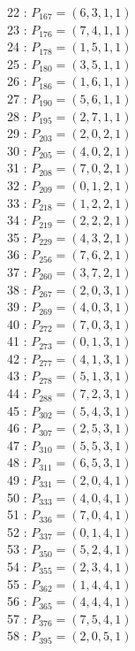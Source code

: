 \documentclass{article}
\begin{document}
{\begin{multicols}{3}
22 : $P_{167}=( 6, 3, 1, 1 )$\\
23 : $P_{176}=( 7, 4, 1, 1 )$\\
24 : $P_{178}=( 1, 5, 1, 1 )$\\
25 : $P_{180}=( 3, 5, 1, 1 )$\\
26 : $P_{186}=( 1, 6, 1, 1 )$\\
27 : $P_{190}=( 5, 6, 1, 1 )$\\
28 : $P_{195}=( 2, 7, 1, 1 )$\\
29 : $P_{203}=( 2, 0, 2, 1 )$\\
30 : $P_{205}=( 4, 0, 2, 1 )$\\
31 : $P_{208}=( 7, 0, 2, 1 )$\\
32 : $P_{209}=( 0, 1, 2, 1 )$\\
33 : $P_{218}=( 1, 2, 2, 1 )$\\
34 : $P_{219}=( 2, 2, 2, 1 )$\\
35 : $P_{229}=( 4, 3, 2, 1 )$\\
36 : $P_{256}=( 7, 6, 2, 1 )$\\
37 : $P_{260}=( 3, 7, 2, 1 )$\\
38 : $P_{267}=( 2, 0, 3, 1 )$\\
39 : $P_{269}=( 4, 0, 3, 1 )$\\
40 : $P_{272}=( 7, 0, 3, 1 )$\\
41 : $P_{273}=( 0, 1, 3, 1 )$\\
42 : $P_{277}=( 4, 1, 3, 1 )$\\
43 : $P_{278}=( 5, 1, 3, 1 )$\\
44 : $P_{288}=( 7, 2, 3, 1 )$\\
45 : $P_{302}=( 5, 4, 3, 1 )$\\
46 : $P_{307}=( 2, 5, 3, 1 )$\\
47 : $P_{310}=( 5, 5, 3, 1 )$\\
48 : $P_{311}=( 6, 5, 3, 1 )$\\
49 : $P_{331}=( 2, 0, 4, 1 )$\\
50 : $P_{333}=( 4, 0, 4, 1 )$\\
51 : $P_{336}=( 7, 0, 4, 1 )$\\
52 : $P_{337}=( 0, 1, 4, 1 )$\\
53 : $P_{350}=( 5, 2, 4, 1 )$\\
54 : $P_{355}=( 2, 3, 4, 1 )$\\
55 : $P_{362}=( 1, 4, 4, 1 )$\\
56 : $P_{365}=( 4, 4, 4, 1 )$\\
57 : $P_{376}=( 7, 5, 4, 1 )$\\
58 : $P_{395}=( 2, 0, 5, 1 )$\\

\end{multicols}}
\end{document}
